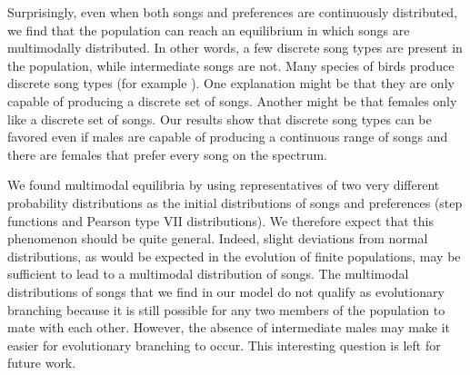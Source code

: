 \documentclass[12pt]{article}
\begin{document}
Surprisingly, even when both songs and preferences are continuously distributed, we find that the population can reach an equilibrium in which songs are multimodally distributed. In other words, a few discrete song types are present in the population, while intermediate songs are not. Many species of birds produce discrete song types (for example \cite{Gibbs:1990fk,Devoogd:1993uq}). One explanation might be that they are only capable of producing a discrete set of songs. Another might be that females only like a discrete set of songs. Our results show that discrete song types can be favored even if males are capable of producing a continuous range of songs and there are females that prefer every song on the spectrum.

We found multimodal equilibria by using representatives of two very different probability distributions as the initial distributions of songs and preferences (step functions and Pearson type VII distributions). We therefore expect that this phenomenon should be quite general. Indeed, slight deviations from normal distributions, as would be expected in the evolution of finite populations, may be sufficient to lead to a multimodal distribution of songs. The multimodal distributions of songs that we find in our model do not qualify as evolutionary branching because it is still possible for any two members of the population to mate with each other. However, the absence of intermediate males may make it easier for evolutionary branching to occur. This interesting question is left for future work. 
 
 
\end{document}
